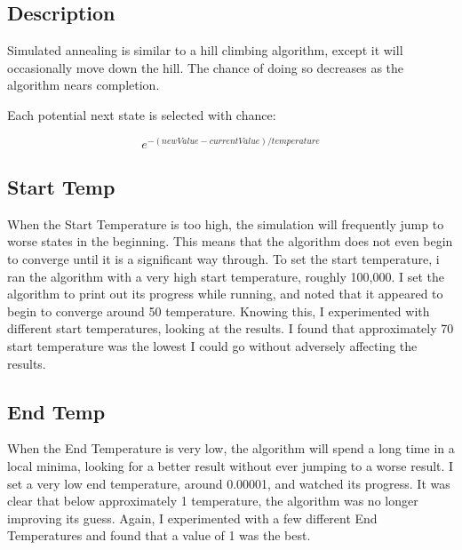 \documentclass[a4paper, 11pt,table]{article}
\begin{document}
	\begin{center}
	\end{center}
	
	\subsection{Description}
	Simulated annealing is similar to a hill climbing algorithm, except it will occasionally move down the hill. The chance of doing so decreases as the algorithm nears completion.
	
	Each potential next state is selected with chance:
	
	\begin{equation}
		e^{-(newValue - currentValue) / temperature}
	\end{equation}
	
	\subsection{Start Temp}
	When the Start Temperature is too high, the simulation will frequently jump to worse states in the beginning. This means that the algorithm does not even begin to converge until it is a significant way through. To set the start temperature, i ran the algorithm with a very high start temperature, roughly 100,000. I set the algorithm to print out its progress while running, and noted that it appeared to begin to converge around 50 temperature. Knowing this, I experimented with different start temperatures, looking at the results. I found that approximately 70 start temperature was the lowest I could go without adversely affecting the results.
	
	\subsection{End Temp}
	When the End Temperature is very low, the algorithm will spend a long time in a local minima, looking for a better result without ever jumping to a worse result. I set a very low end temperature, around 0.00001, and watched its progress. It was clear that below approximately 1 temperature, the algorithm was no longer improving its guess. Again, I experimented with a few different End Temperatures and found that a value of 1 was the best.
	
\end{document}
